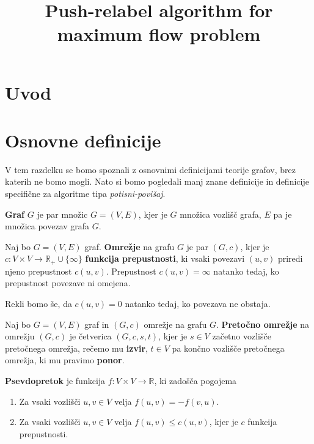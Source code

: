 \documentclass[mat1]{fmfdelo}
\title{Push-relabel algorithm for maximum flow problem}
\begin{document}
\section{Uvod}

\section{Osnovne definicije}

V tem razdelku se bomo spoznali z osnovnimi definicijami teorije grafov, brez katerih ne bomo mogli. Nato si bomo pogledali manj znane definicije in definicije specifične za algoritme tipa \textit{potisni-povišaj}.

\begin{definicija}
\textbf{Graf} $G$ je par množic $G = (V,E)$, kjer je $G$ množica vozlišč grafa, $E$ pa je množica povezav grafa $G$.
\end{definicija}

\begin{definicija}
Naj bo $G = (V, E)$ graf. \textbf{Omrežje} na grafu $G$ je par $(G, c)$, kjer je $c \colon V \times V \rightarrow \mathbb{R}_+ \cup \{\infty\}$ \textbf{funkcija prepustnosti}, ki vsaki povezavi $(u,v)$ priredi njeno prepustnost $c(u,v)$. Prepustnost $c(u,v) = \infty$ natanko tedaj, ko prepustnost povezave ni omejena.
\end{definicija}

Rekli bomo še, da $c(u,v)=0$ natanko tedaj, ko povezava ne obstaja.

\begin{definicija}
Naj bo $G = (V,E)$ graf in $(G,c)$ omrežje na grafu $G$. \textbf{Pretočno omrežje} na omrežju $(G,c)$ je četverica $(G,c,s,t)$, kjer je $s\in V$ začetno vozlišče pretočnega omrežja, rečemo mu \textbf{izvir}, $t\in V$ pa končno vozlišče pretočnega omrežja, ki mu pravimo \textbf{ponor}.
\end{definicija}

\begin{definicija}
\textbf{Psevdopretok} je funkcija $f \colon V \times V \rightarrow \mathbb{R}$, ki zadošča pogojema
\begin{enumerate}
\item Za vsaki vozlišči $u,v \in V$ velja $f(u,v) = - f(v,u)$.
\item Za vsaki vozlišči $u,v \in V$ velja $f(u,v) \leq c(u,v)$, kjer je $c$ funkcija prepustnosti.
\end{enumerate}
\end{definicija}
\end{document}
